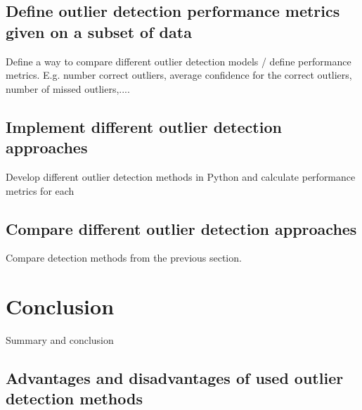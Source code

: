 \subsection{Define outlier detection performance metrics given on a subset of data}
Define a way to compare different outlier detection models / define performance metrics. E.g. number correct outliers, average confidence for the correct outliers, number of missed outliers,.... 
\subsection{Implement different outlier detection approaches}
Develop different outlier detection methods in Python and calculate performance metrics for each
\subsection{Compare different outlier detection approaches}
Compare detection methods from the previous section.
\section{Conclusion}
Summary and conclusion
\subsection{Advantages and disadvantages of used outlier detection methods}
